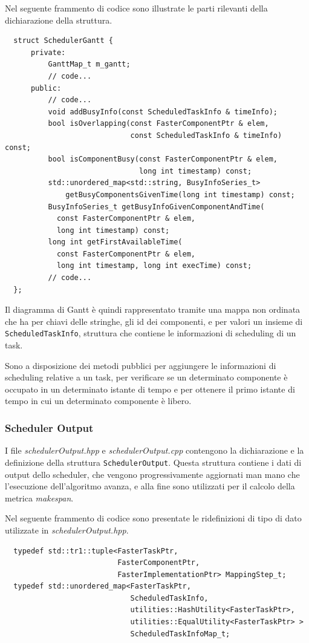 Nel seguente frammento di codice sono illustrate le parti rilevanti della 
dichiarazione della struttura.
\newline
\begin{verbatim}
  struct SchedulerGantt {
      private:
          GanttMap_t m_gantt;
          // code...
      public:
          // code...
          void addBusyInfo(const ScheduledTaskInfo & timeInfo);
          bool isOverlapping(const FasterComponentPtr & elem,
                             const ScheduledTaskInfo & timeInfo) const;
          bool isComponentBusy(const FasterComponentPtr & elem,
                               long int timestamp) const;
          std::unordered_map<std::string, BusyInfoSeries_t> 
              getBusyComponentsGivenTime(long int timestamp) const;
          BusyInfoSeries_t getBusyInfoGivenComponentAndTime(
            const FasterComponentPtr & elem,
            long int timestamp) const;
          long int getFirstAvailableTime(
            const FasterComponentPtr & elem, 
            long int timestamp, long int execTime) const;
          // code...
  };
\end{verbatim}
Il diagramma di Gantt è quindi rappresentato tramite una mappa non ordinata 
che ha per chiavi delle stringhe, gli id dei componenti, e per valori un 
insieme di \verb+ScheduledTaskInfo+, struttura che contiene le informazioni di 
scheduling di un task.

Sono a disposizione dei metodi pubblici per aggiungere le informazioni di 
scheduling relative a un task, per verificare se un determinato componente è 
occupato in un determinato istante di tempo e per ottenere il primo istante di 
tempo in cui un determinato componente è libero.

\subsubsection{Scheduler Output}
I file \emph{schedulerOutput.hpp} e \emph{schedulerOutput.cpp} contengono la 
dichiarazione e la definizione della struttura \verb+SchedulerOutput+. Questa 
struttura contiene i dati di output dello scheduler, che vengono 
progressivamente aggiornati man mano che l'esecuzione dell'algoritmo avanza, e 
alla fine sono utilizzati per il calcolo della metrica \emph{makespan}.


Nel seguente frammento di codice sono presentate le ridefinizioni di tipo di 
dato utilizzate in \emph{schedulerOutput.hpp}.
\newline
\begin{verbatim}
  typedef std::tr1::tuple<FasterTaskPtr,
                          FasterComponentPtr, 
                          FasterImplementationPtr> MappingStep_t;
  typedef std::unordered_map<FasterTaskPtr,
                             ScheduledTaskInfo, 
                             utilities::HashUtility<FasterTaskPtr>, 
                             utilities::EqualUtility<FasterTaskPtr> > 
                             ScheduledTaskInfoMap_t;
\end{verbatim}

